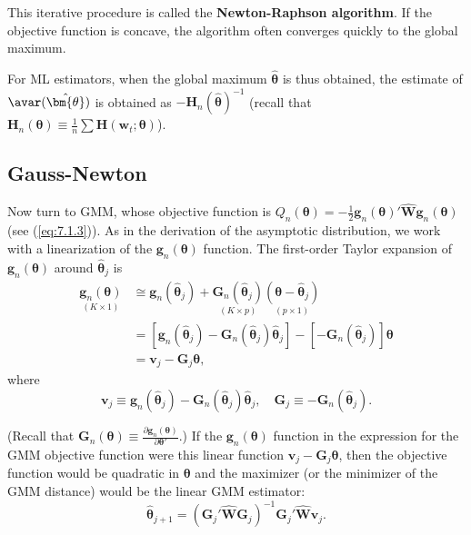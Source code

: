This iterative procedure is called the \textbf{Newton-Raphson algorithm}. If the objective function is concave, the algorithm often converges quickly to the global maximum.

For ML estimators, when the global maximum $\hat{\bm{\theta}}$ is thus obtained, the estimate of $\avar(\hat{\bm{\theta}})$ is obtained as $-\mathbf{H}_n(\hat{\bm{\theta}})^{-1}$ (recall that $\mathbf{H}_n(\bm{\theta}) \equiv \frac{1}{n}\sum\mathbf{H}(\mathbf{w}_t; \bm{\theta})$).

\subsection*{Gauss-Newton}

Now turn to GMM, whose objective function is $Q_n(\bm{\theta}) = -\frac{1}{2}\mathbf{g}_n(\bm{\theta})'\widehat{\mathbf{W}}\mathbf{g}_n(\bm{\theta})$ (see (\ref{eq:7.1.3})). As in the derivation of the asymptotic distribution, we work with a linearization of the $\mathbf{g}_n(\bm{\theta})$ function. The first-order Taylor expansion of $\mathbf{g}_n(\bm{\theta})$ around $\hat{\bm{\theta}}_j$ is
\begin{equation}
\label{eq:7.5.4}
\begin{split}
\underset{(K \times 1)}{\mathbf{g}_n(\bm{\theta})} &\cong \mathbf{g}_n(\hat{\bm{\theta}}_j) + \underset{(K \times p)}{\mathbf{G}_n(\hat{\bm{\theta}}_j)}\underset{(p \times 1)}{(\bm{\theta} - \hat{\bm{\theta}}_j)} \\
&= [\mathbf{g}_n(\hat{\bm{\theta}}_j) - \mathbf{G}_n(\hat{\bm{\theta}}_j)\hat{\bm{\theta}}_j] - [-\mathbf{G}_n(\hat{\bm{\theta}}_j)]\bm{\theta} \\
&= \mathbf{v}_j - \mathbf{G}_j\bm{\theta},
\end{split}
\end{equation}
where
\begin{equation}
\label{eq:7.5.5}
\mathbf{v}_j \equiv \mathbf{g}_n(\hat{\bm{\theta}}_j) - \mathbf{G}_n(\hat{\bm{\theta}}_j)\hat{\bm{\theta}}_j, \quad \mathbf{G}_j \equiv -\mathbf{G}_n(\hat{\bm{\theta}}_j).
\end{equation}

(Recall that $\mathbf{G}_n(\bm{\theta}) \equiv \frac{\partial\mathbf{g}_n(\bm{\theta})}{\partial\bm{\theta}'}$.) If the $\mathbf{g}_n(\bm{\theta})$ function in the expression for the GMM objective function were this linear function $\mathbf{v}_j - \mathbf{G}_j\bm{\theta}$, then the objective function would be quadratic in $\bm{\theta}$ and the maximizer (or the minimizer of the GMM distance) would be the linear GMM estimator:
\begin{equation}
\label{eq:7.5.6}
\hat{\bm{\theta}}_{j+1} = (\mathbf{G}_j'\widehat{\mathbf{W}}\mathbf{G}_j)^{-1}\mathbf{G}_j'\widehat{\mathbf{W}}\mathbf{v}_j.
\end{equation}


